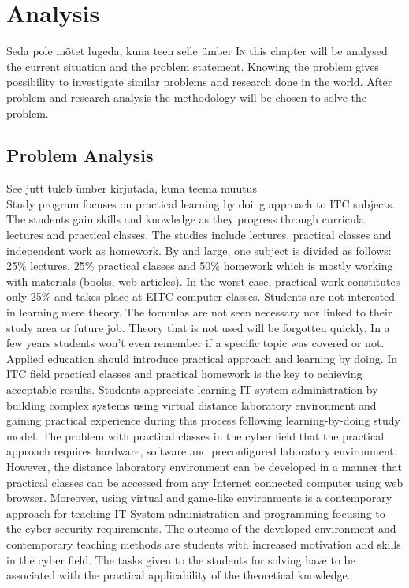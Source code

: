 \chapter{Analysis}
\label{analysis}


{\color{red} Seda pole mõtet lugeda, kuna teen selle ümber }
\lettrine[lraise=0.1, nindent=0em, slope=-.5em]{\color{Violet}I}{n} this chapter will be analysed the current situation and the problem statement. Knowing the problem gives possibility to investigate similar problems and research done in the world. After problem and research analysis the methodology will be chosen to solve the problem.




\section{Problem Analysis}
\label{Problem Analysis}

{\color{red} See jutt tuleb ümber kirjutada, kuna teema muutus}\\
Study program focuses on practical learning by doing approach to ITC subjects. The students gain skills and knowledge as they progress through curricula lectures and practical classes. The studies include lectures, practical classes and independent work as homework. By and large, one subject is divided as follows: 25\% lectures, 25\% practical classes and 50\% homework which is mostly working with materials (books, web articles). In the worst case, practical work constitutes only 25\% and takes place at \gls{EITC} computer classes. Students are not interested in learning mere theory. The formulas are not seen necessary nor linked to their study area or future job. Theory that is not used will be forgotten quickly. In a few years students won't even remember if a specific topic was covered or not. Applied education should introduce practical approach and learning by doing. In ITC field practical classes and practical homework is the key to achieving acceptable results. Students appreciate learning IT system administration by building complex systems using virtual distance laboratory environment and gaining practical experience during this process following learning-by-doing study model.
The problem with practical classes in the cyber field that the practical approach requires hardware, software and preconfigured laboratory environment. However, the  distance laboratory environment can be developed in a manner  that practical classes can be accessed from any Internet connected computer using web browser. Moreover, using virtual and game-like environments is a contemporary approach for teaching IT System administration and programming focusing to the cyber security requirements. The outcome of the developed environment and contemporary teaching methods are students with increased motivation and skills in the cyber field. The tasks given to the students for solving have to be associated with the practical applicability of the theoretical knowledge.






